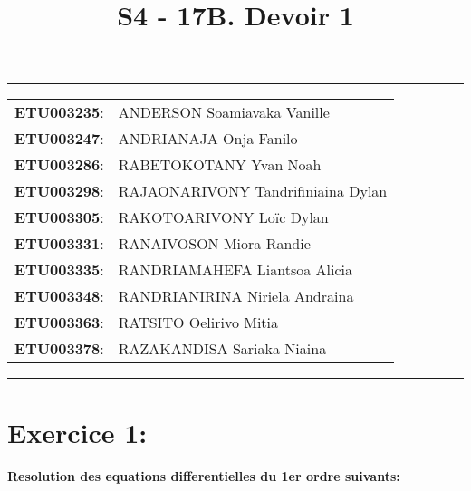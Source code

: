 \documentclass[a4paper,12pt]{article}
\begin{document}
	
\title{\textbf{S4 - 17B. Devoir 1}}
\date{}
\maketitle

\hrule
\vspace{1em}

\begin{tabular}{rl}
	\textbf{ETU003235}: & ANDERSON Soamiavaka Vanille \\
	\textbf{ETU003247}: & ANDRIANAJA Onja Fanilo \\
	\textbf{ETU003286}: & RABETOKOTANY Yvan Noah \\
	\textbf{ETU003298}: & RAJAONARIVONY Tandrifiniaina Dylan \\
	\textbf{ETU003305}: & RAKOTOARIVONY Loïc Dylan \\
	\textbf{ETU003331}: & RANAIVOSON Miora Randie \\
	\textbf{ETU003335}: & RANDRIAMAHEFA Liantsoa Alicia \\
	\textbf{ETU003348}: & RANDRIANIRINA Niriela Andraina \\
	\textbf{ETU003363}: & RATSITO Oelirivo Mitia \\
	\textbf{ETU003378}: & RAZAKANDISA Sariaka Niaina \\
\end{tabular}

\vspace{1em}
\hrule

\newpage
\section*{Exercice 1:}
\textbf{Resolution des equations differentielles du 1er ordre suivants:}
\end{document}
